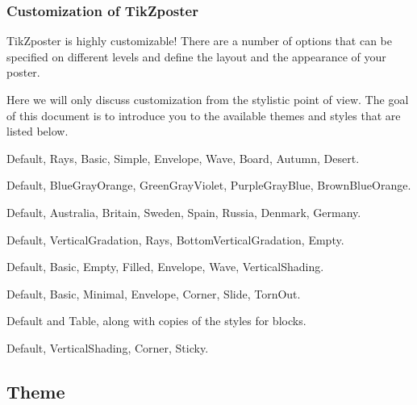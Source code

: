 \documentclass[9pt]{beamer}
\begin{document}
\begin{frame}
  \frametitle{Customization of TikZposter}
  
  TikZposter is highly customizable!  There are a number of options
  that can be specified on different levels and define the layout and
  the appearance of your poster.

  \medskip%
  Here we will only discuss customization from the stylistic point of
  view. The goal of this document is to introduce you to the available
  themes and styles that are listed below.

  \begin{description}\small
  \item[Themes:] Default, Rays, Basic, Simple, Envelope, Wave,
    Board, Autumn, Desert.
  
  \item[Color palettes:] Default, BlueGrayOrange, GreenGrayViolet,
    PurpleGrayBlue, BrownBlueOrange.

  \item[Color styles:] Default, Australia, Britain, Sweden, Spain,
    Russia, Denmark, Germany.

  \item[Backgrounds:] Default, VerticalGradation, Rays,
    BottomVerticalGradation, Empty.

  \item[Titles:] Default, Basic, Empty, Filled, Envelope, Wave, VerticalShading.

  \item[Blocks:] Default, Basic, Minimal, Envelope, Corner,
    Slide, TornOut.

  \item[Inner blocks:] Default and Table, along with copies of
    the styles for blocks.

  \item[Notes:] Default, VerticalShading, Corner, Sticky.
  \end{description}
\end{frame}

\subsection{Theme}
\end{document}
